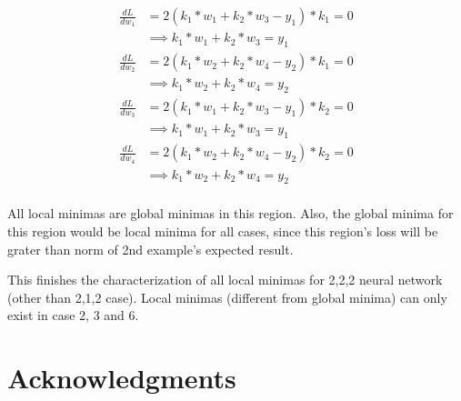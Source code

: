\documentclass[conference]{IEEEtran}
\begin{document}
\begin{enumerate}
	\begin{align*}
	\frac{dL}{dw_1} &= 2(k_1*w_1 + k_2*w_3 - y_1)* k_1 = 0\\ 
	&\implies k_1*w_1 + k_2*w_3 = y_1\\
	\frac{dL}{dw_2} &= 2(k_1*w_2 + k_2*w_4 - y_2)* k_1 = 0\\ 
	&\implies k_1*w_2 + k_2*w_4 = y_2\\
	\frac{dL}{dw_3} &= 2(k_1*w_1 + k_2*w_3 - y_1)* k_2 = 0\\
	&\implies k_1*w_1 + k_2*w_3 = y_1\\
	\frac{dL}{dw_4} &= 2(k_1*w_2 + k_2*w_4 - y_2)* k_2 = 0\\ 
	&\implies  k_1*w_2 + k_2*w_4 = y_2\\
	\end{align*}
	
	All local minimas are global minimas in this region. Also, the global minima for this region would be local minima for all cases, since this region's loss will be grater than norm of 2nd example's expected result.
	
\end{enumerate}

This finishes the characterization of all local minimas for 2,2,2 neural network (other than 2,1,2 case). Local minimas (different from global minima) can only exist in case 2, 3 and 6.

\section*{Acknowledgments}




\end{document}

